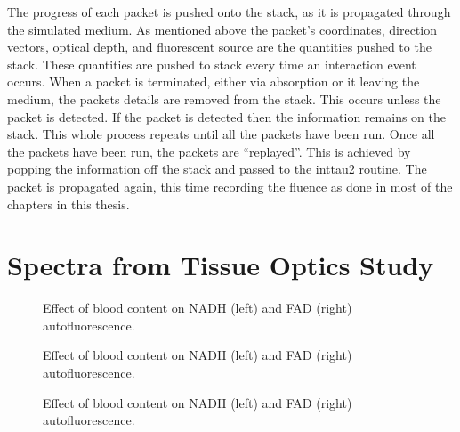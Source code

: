 \begin{appendices}
The progress of each packet is pushed onto the stack, as it is propagated through the simulated medium. 
As mentioned above the packet's coordinates, direction vectors, optical depth, and fluorescent source are the quantities pushed to the stack.
These quantities are pushed to stack every time an interaction event occurs.
When a packet is terminated, either via absorption or it leaving the medium, the packets details are removed from the stack.
This occurs unless the packet is detected.
If the packet is detected then the information remains on the stack.
This whole process repeats until all the packets have been run.
Once all the packets have been run, the packets are ``replayed''.
This is achieved by popping the information off the stack and passed to the inttau2 routine.
The packet is propagated again, this time recording the fluence as done in most of the chapters in this thesis.


\chapter{Spectra from Tissue Optics Study}
\label{app:spectra}


\begin{figure}[!htbp]
    \centering
    \caption{Effect of blood content on NADH (left) and FAD (right) autofluorescence.}%
    \label{fig:260nadhfad-blood}%
\end{figure}

\begin{figure}[!htbp]
    \centering
    \caption{Effect of blood content on NADH (left) and FAD (right) autofluorescence.}%
    \label{fig:320nadhfad-blood}%
\end{figure}

\begin{figure}[!htbp]
    \centering
    \caption{Effect of blood content on NADH (left) and FAD (right) autofluorescence.}%
    \label{fig:365nadhfad-blood}%
\end{figure}


\end{appendices}
